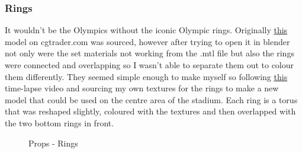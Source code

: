 \documentclass[a4 paper, 12pt]{article}
\begin{document}
\subsubsection{Rings}
It wouldn't be the Olympics without the iconic Olympic rings. Originally \href{https://www.cgtrader.com/free-3d-models/architectural/other/3d-olympic-rings}{this} model on cgtrader.com was sourced, however after trying to open it in blender not only were the set materials not working from the .mtl file but also the rings were connected and overlapping so I wasn't able to separate them out to colour them differently. They seemed simple enough to make myself so following \href{https://www.youtube.com/watch?v=yaWl43Z0QQk}{this} time-lapse video and sourcing my own textures for the rings to make a new model that could be used on the centre area of the stadium. Each ring is a torus that was reshaped slightly, coloured with the textures and then overlapped with the two bottom rings in front. 
    \begin{figure} [H]
        \caption{Props - Rings}   
    \end{figure}
\end{document}
